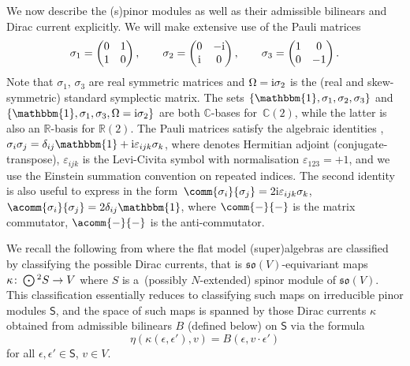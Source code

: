 \documentclass[pdftex]{sigma}
\numberwithin{equation}{section}
\newcommand{\fso}{\mathfrak{so}}
\newcommand{\RR}{\mathbb{R}}
\newcommand{\CC}{\mathbb{C}}
\newcommand{\ssS}{\mathsf{S}}
\newcommand{\Odot}{\mathchoice{{\textstyle\bigodot}}{\bigodot}{\bigodot}{\bigodot}}
\newcommand{\1}{\mathbbm{1}}
\begin{document}
We now describe the (s)pinor modules as well as their admissible bilinears and Dirac current explicitly. We will make extensive use of the Pauli matrices
\[%
	\sigma_1 = \begin{pmatrix} 0 & 1 \\ 1 & 0 \end{pmatrix},
	\qquad\sigma_2 = \begin{pmatrix} 0 & -{\rm i} \\ {\rm i} & 0 \end{pmatrix},
	\qquad \sigma_3 = \begin{pmatrix} 1 & 0 \\ 0 & -1 \end{pmatrix}.
\]
Note that $\sigma_1$, $\sigma_3$ are real symmetric matrices and $\Omega = {\rm i}\sigma_2$ is the (real and skew-symmetric) standard symplectic matrix. The sets $\{\1,\sigma_1,\sigma_2,\sigma_3\}$ and $\{\1,\sigma_1,\sigma_3,\Omega={\rm i}\sigma_2\}$ are both $\CC$-bases for~$\CC(2)$, while the latter is also an $\RR$-basis for $\RR(2)$. The Pauli matrices satisfy the algebraic identities
,
$ \sigma_i \sigma_j = \delta_{ij}\1 + {\rm i}\varepsilon_{ijk}\sigma_k$,
where \smash{${}^\dagger$} denotes Hermitian adjoint (conjugate-transpose), $\varepsilon_{ijk}$ is the Levi-Civita symbol with normalisation $\varepsilon_{123}=+1$, and we use the Einstein summation convention on repeated indices. The second identity is also useful to express in the form~${\comm{\sigma_i}{\sigma_j} = 2{\rm i}\varepsilon_{ijk}\sigma_k}$,
$\acomm{\sigma_i}{\sigma_j} = 2\delta_{ij}\1$,
where $\comm{-}{-}$ is the matrix commutator, $\acomm{-}{-}$ is the anti-commutator.

We recall the following from \cite{Alekseevsky1997} where the flat model (super)algebras are classified by classifying the possible Dirac currents, that is $\fso(V)$-equivariant maps $\kappa\colon\Odot^2S\to V$ where $S$ is a~(possibly $N$-extended) spinor module of $\fso(V)$. This classification essentially reduces to classifying such maps on irreducible pinor modules $\ssS$, and the space of such maps is spanned by those Dirac currents $\kappa$ obtained from admissible bilinears $B$ (defined below) on $\ssS$ via the formula
\begin{equation}\label{eq:current-bilinear-corresp}
	\eta(\kappa(\epsilon,\epsilon'),v) = B(\epsilon,v\cdot\epsilon')
\end{equation}
for all $\epsilon,\epsilon'\in\ssS$, $v\in V$.
\end{document}
